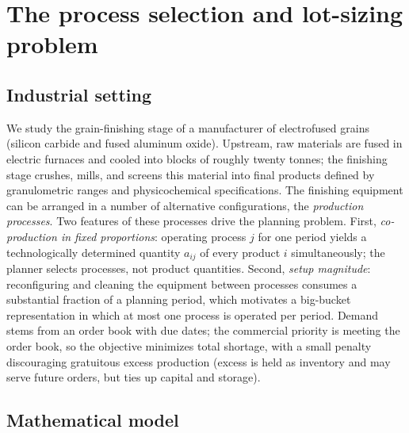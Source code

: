 \section{The process selection and lot-sizing problem}
\label{sec:problem}

\subsection{Industrial setting}
\label{sec:setting}

We study the grain-finishing stage of a manufacturer of electrofused
grains (silicon carbide and fused aluminum oxide). Upstream, raw
materials are fused in electric furnaces and cooled into blocks of
roughly twenty tonnes; the finishing stage crushes, mills, and screens
this material into final products defined by granulometric ranges and
physicochemical specifications. The finishing equipment can be
arranged in a number of alternative configurations, the
\emph{production processes}. Two features of these processes drive the
planning problem. First, \emph{co-production in fixed proportions}:
operating process $j$ for one period yields a technologically
determined quantity $a_{ij}$ of every product $i$ simultaneously; the
planner selects processes, not product quantities. Second,
\emph{setup magnitude}: reconfiguring and cleaning the equipment
between processes consumes a substantial fraction of a planning
period, which motivates a big-bucket representation in which at most
one process is operated per period. Demand stems from an order book
with due dates; the commercial priority is meeting the order book, so
the objective minimizes total shortage, with a small penalty
discouraging gratuitous excess production (excess is held as
inventory and may serve future orders, but ties up capital and
storage). 

\subsection{Mathematical model}
\label{sec:model}

